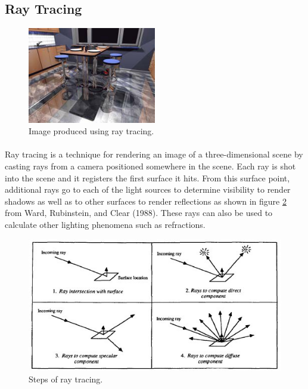 \subsection{Ray Tracing}

\begin{figure}[h!]
  \centering
    \includegraphics[width=0.5\textwidth]{raytraceSample.jpg}
  \caption{Image produced using ray tracing.}
	\label{fig:raytraceSample}
\end{figure}

\paragraph{}
Ray tracing is a technique for rendering an image of a three-dimensional scene by casting rays from a camera positioned somewhere in the scene.  Each ray is shot into the scene and it registers the first surface it hits.  From this surface point, additional rays go to each of the light sources to determine visibility to render shadows as well as to other surfaces to render reflections as shown in figure \ref{fig:raytraceCalc} from Ward, Rubinstein, and Clear (1988).  These rays can also be used to calculate other lighting phenomena such as refractions.

\begin{figure}[h!]
  \centering
    \includegraphics[width=1.0\textwidth]{raytraceCalc.jpg}
  \caption{Steps of ray tracing.}
	\label{fig:raytraceCalc}
\end{figure}


